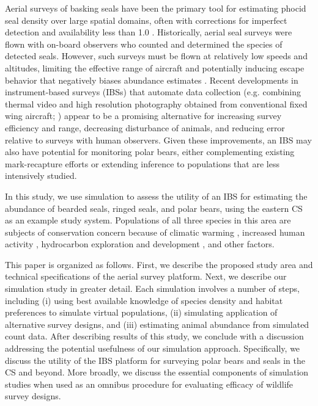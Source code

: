 \documentclass[]{rsos}%
\begin{document}
Aerial surveys of basking seals have been the primary tool for estimating phocid seal density over large spatial domains, often with corrections for imperfect detection and availability less than 1.0 \cite{Bengtson2005,VerHoefJansen2007,VerHoefEtAl2014,ConnEtAl2014}.
Historically, aerial seal surveys were flown with on-board observers who counted and determined the species of detected seals. However, such surveys must be flown at relatively low speeds and altitudes, limiting the effective range of aircraft and potentially inducing escape behavior that negatively biases abundance estimates \cite{BornEtAl1999}. Recent developments in instrument-based surveys (IBSs) that automate data collection (e.g. combining thermal video and high resolution photography obtained from conventional fixed wing aircraft; \cite{ChernookEtAl1999,ConnEtAl2014}) appear to be a promising alternative for increasing survey efficiency and range, decreasing disturbance of animals, and reducing error relative to surveys with human observers.  Given these improvements, an IBS may also have potential for monitoring polar bears, either complementing existing mark-recapture efforts or extending inference to populations that are less intensively studied.

In this study, we use simulation to assess the utility of an IBS for estimating the abundance of bearded seals, ringed seals, and polar bears, using the eastern CS as an example study system.  Populations of all three species in this area are subjects of conservation concern because of climatic warming \cite{LaidreEtAl2015}, increased human activity \cite{StephensonEtAl2013}, hydrocarbon exploration and development \cite{WilsonEtAl2014}, and other factors.

This paper is organized as follows.  First, we describe the proposed study area and technical specifications of the aerial survey platform.  Next, we describe our simulation study in greater detail.  Each simulation involves a number of steps, including (i) using best available knowledge of species density and habitat preferences to simulate virtual populations, (ii) simulating application of alternative survey designs, and (iii) estimating animal abundance from simulated count data.  After describing results of this study, we conclude with a discussion addressing the potential usefulness of our simulation approach.  Specifically, we discuss the utility of the IBS platform for surveying polar bears and seals in the CS and beyond. More broadly, we discuss the essential components of simulation studies when used as an omnibus procedure for evaluating efficacy of wildlife survey designs.
\end{document}
